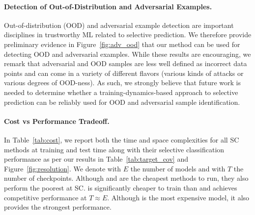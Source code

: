 \paragraph{Detection of Out-of-Distribution and Adversarial Examples.}

Out-of-distribution (OOD) and adversarial example detection are important disciplines in trustworthy ML related to selective prediction. We therefore provide preliminary evidence in Figure~\ref{fig:adv_ood} that our method can be used for detecting OOD and adversarial examples. While these results are encouraging, we remark that adversarial and OOD samples are less well defined as incorrect data points and can come in a variety of different flavors (\ie various kinds of attacks or various degrees of OOD-ness). As such, we strongly believe that future work is needed to determine whether a training-dynamics-based approach to selective prediction can be reliably used for OOD and adversarial sample identification. 

\paragraph{Cost vs Performance Tradeoff.} 

In Table~\ref{tab:cost}, we report both the time and space complexities for all SC methods at training and test time along with their selective classification performance as per our results in Table~\ref{tab:target_cov} and Figure~\ref{fig:resolution}. We denote with $E$ the number of  \de models and with $T$ the number of \sptd checkpoints. Although \sr and \sat are the cheapest methods to run, they also perform the poorest at SC. \sptd is significantly cheaper to train than \de and achieves competitive performance at $T \approx E$. Although \sptdde is the most expensive model, it also provides the strongest performance.

